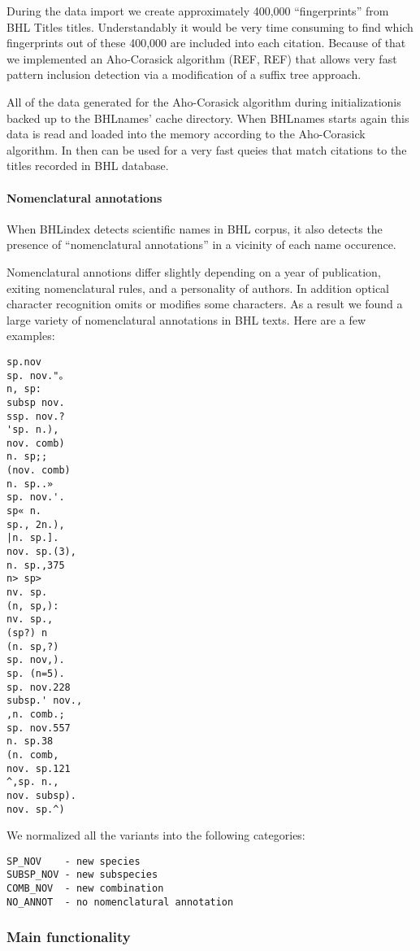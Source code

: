 \documentclass[
]{article}
\begin{document}
During the data import we create approximately 400,000 ``fingerprints''
from BHL Titles titles. Understandably it would be very time consuming
to find which fingerprints out of these 400,000 are included into each
citation. Because of that we implemented an Aho-Corasick algorithm (REF,
REF) that allows very fast pattern inclusion detection via a
modification of a suffix tree approach.

All of the data generated for the Aho-Corasick algorithm during
initializationis backed up to the BHLnames' cache directory. When
BHLnames starts again this data is read and loaded into the memory
according to the Aho-Corasick algorithm. In then can be used for a very
fast queies that match citations to the titles recorded in BHL database.

\hypertarget{nomenclatural-annotations}{%
\paragraph{Nomenclatural annotations}\label{nomenclatural-annotations}}

When BHLindex detects scientific names in BHL corpus, it also detects
the presence of ``nomenclatural annotations'' in a vicinity of each name
occurence.

Nomenclatural annotions differ slightly depending on a year of
publication, exiting nomenclatural rules, and a personality of authors.
In addition optical character recognition omits or modifies some
characters. As a result we found a large variety of nomenclatural
annotations in BHL texts. Here are a few examples:

\begin{verbatim}
sp.nov
sp. nov."。
n, sp:
subsp nov.
ssp. nov.?
'sp. n.),
nov. comb)
n. sp;;
(nov. comb)
n. sp..»
sp. nov.'.
sp« n.
sp., 2n.),
|n. sp.].
nov. sp.(3),
n. sp.,375
n> sp>
nv. sp.
(n, sp,):
nv. sp.,
(sp?) n
(n. sp,?)
sp. nov,).
sp. (n=5).
sp. nov.228
subsp.' nov.,
,n. comb.;
sp. nov.557
n. sp.38
(n. comb,
nov. sp.121
^,sp. n.,
nov. subsp).
nov. sp.^)
\end{verbatim}

We normalized all the variants into the following categories:

\begin{verbatim}
SP_NOV    - new species
SUBSP_NOV - new subspecies
COMB_NOV  - new combination
NO_ANNOT  - no nomenclatural annotation
\end{verbatim}

\hypertarget{main-functionality}{%
\subsubsection{Main functionality}\label{main-functionality}}
\end{document}
